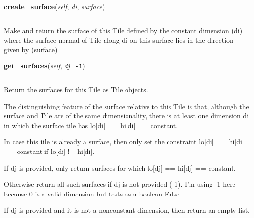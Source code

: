     \label{Tiling:Tile:create_surface}

    \vspace{0.5ex}

\hspace{.8\funcindent}\begin{boxedminipage}{\funcwidth}

    \raggedright \textbf{create\_surface}(\textit{self}, \textit{di}, \textit{surface})

    \vspace{-1.5ex}

    \rule{\textwidth}{0.5\fboxrule}
\setlength{\parskip}{2ex}
    Make and return the surface of this Tile defined by the constant 
    dimension (di) where the surface normal of Tile along di on this 
    surface lies in the direction given by (surface)

\setlength{\parskip}{1ex}
    \end{boxedminipage}

    \label{Tiling:Tile:get_surfaces}

    \vspace{0.5ex}

\hspace{.8\funcindent}\begin{boxedminipage}{\funcwidth}

    \raggedright \textbf{get\_surfaces}(\textit{self}, \textit{dj}={\tt -1})

    \vspace{-1.5ex}

    \rule{\textwidth}{0.5\fboxrule}
\setlength{\parskip}{2ex}
    Return the surfaces for this Tile as Tile objects.

    The distinguishing feature of the surface relative to this Tile is 
    that, although the surface and Tile are of the same dimensionality, 
    there is at least one dimension di in which the surface tile has lo[di]
    == hi[di] == constant.

    In case this tile is already a surface, then only set the constraint 
    lo[di] == hi[di] == constant if lo[di] != hi[di].

    If dj is provided, only return surfaces for which lo[dj] == hi[dj] == 
    constant.

    Otherwise return all such surfaces if dj is not provided (-1). I'm 
    using -1 here because 0 is a valid dimension but tests as a boolean 
    False.

    If dj is provided and it is not a nonconstant dimension, then return an
    empty list.

\setlength{\parskip}{1ex}
    \end{boxedminipage}

